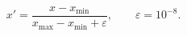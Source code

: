 \begin{equation}
    x' = \frac{x - x_{\min}}{x_{\max} - x_{\min} + \varepsilon},\qquad \varepsilon = 10^{-8}.
\label{eq:min_max}
\end{equation}